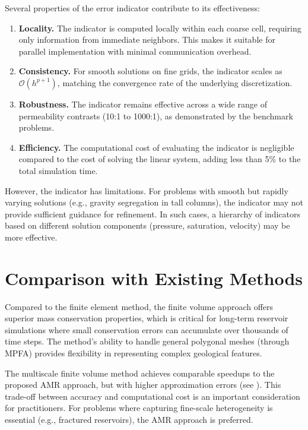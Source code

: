Several properties of the error indicator contribute to its effectiveness:

\begin{enumerate}
    \item \textbf{Locality.} The indicator is computed locally within each coarse cell, requiring only information from immediate neighbors. This makes it suitable for parallel implementation with minimal communication overhead.

    \item \textbf{Consistency.} For smooth solutions on fine grids, the indicator scales as $\mathcal{O}(h^{p+1})$, matching the convergence rate of the underlying discretization.

    \item \textbf{Robustness.} The indicator remains effective across a wide range of permeability contrasts (10:1 to 1000:1), as demonstrated by the benchmark problems.

    \item \textbf{Efficiency.} The computational cost of evaluating the indicator is negligible compared to the cost of solving the linear system, adding less than 5\% to the total simulation time.
\end{enumerate}

However, the indicator has limitations. For problems with smooth but rapidly varying solutions (e.g., gravity segregation in tall columns), the indicator may not provide sufficient guidance for refinement. In such cases, a hierarchy of indicators based on different solution components (pressure, saturation, velocity) may be more effective.

\section{Comparison with Existing Methods}
\label{sec:discussion:comparison}

Compared to the finite element method, the finite volume approach offers superior mass conservation properties, which is critical for long-term reservoir simulations where small conservation errors can accumulate over thousands of time steps. The method's ability to handle general polygonal meshes (through MPFA) provides flexibility in representing complex geological features.

The multiscale finite volume method achieves comparable speedups to the proposed AMR approach, but with higher approximation errors (see ). This trade-off between accuracy and computational cost is an important consideration for practitioners. For problems where capturing fine-scale heterogeneity is essential (e.g., fractured reservoirs), the AMR approach is preferred.

